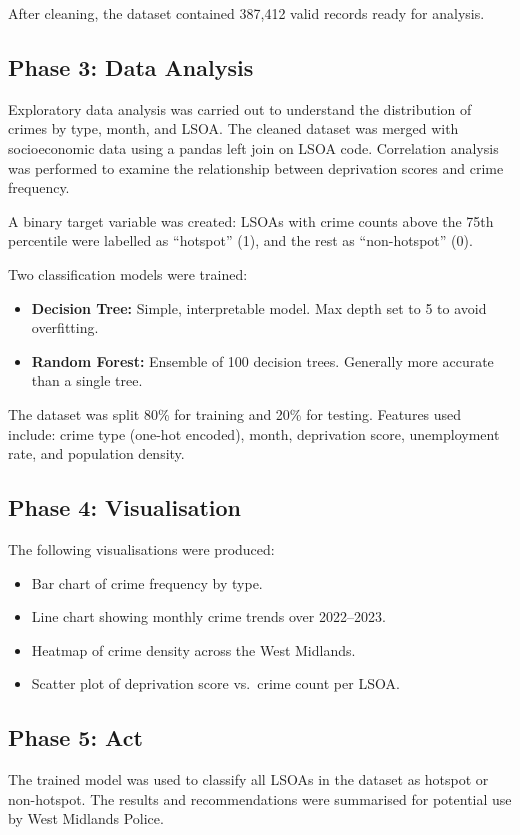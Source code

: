 \documentclass[conference]{IEEEtran}
\begin{document}
After cleaning, the dataset contained 387,412 valid records ready for analysis.

\subsection{Phase 3: Data Analysis}
Exploratory data analysis was carried out to understand the distribution of crimes by type, month, and LSOA. The cleaned dataset was merged with socioeconomic data using a pandas left join on LSOA code. Correlation analysis was performed to examine the relationship between deprivation scores and crime frequency.

A binary target variable was created: LSOAs with crime counts above the 75th percentile were labelled as ``hotspot'' (1), and the rest as ``non-hotspot'' (0).

Two classification models were trained:
\begin{itemize}
    \item \textbf{Decision Tree:} Simple, interpretable model. Max depth set to 5 to avoid overfitting.
    \item \textbf{Random Forest:} Ensemble of 100 decision trees. Generally more accurate than a single tree.
\end{itemize}

The dataset was split 80\% for training and 20\% for testing. Features used include: crime type (one-hot encoded), month, deprivation score, unemployment rate, and population density.

\subsection{Phase 4: Visualisation}
The following visualisations were produced:
\begin{itemize}
    \item Bar chart of crime frequency by type.
    \item Line chart showing monthly crime trends over 2022--2023.
    \item Heatmap of crime density across the West Midlands.
    \item Scatter plot of deprivation score vs.\ crime count per LSOA.
\end{itemize}

\subsection{Phase 5: Act}
The trained model was used to classify all LSOAs in the dataset as hotspot or non-hotspot. The results and recommendations were summarised for potential use by West Midlands Police.
\end{document}
